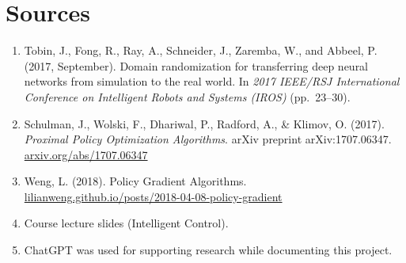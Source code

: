 \documentclass[11pt]{article}
\begin{document}
\section{Sources}

\begin{enumerate}
  \item Tobin, J., Fong, R., Ray, A., Schneider, J., Zaremba, W., and Abbeel, P. (2017, September).
  Domain randomization for transferring deep neural networks from simulation to the real world. In
  \emph{2017 IEEE/RSJ International Conference on Intelligent Robots and Systems (IROS)} (pp.~23--30).
  \item Schulman, J., Wolski, F., Dhariwal, P., Radford, A., \& Klimov, O. (2017). \emph{Proximal Policy
  Optimization Algorithms}. arXiv preprint arXiv:1707.06347.
  \href{https://arxiv.org/abs/1707.06347}{arxiv.org/abs/1707.06347}
  \item Weng, L. (2018). Policy Gradient Algorithms.
  \href{https://lilianweng.github.io/posts/2018-04-08-policy-gradient/}{lilianweng.github.io/posts/2018-04-08-policy-gradient}
  \item Course lecture slides (Intelligent Control).
  \item ChatGPT was used for supporting research while documenting this project.
\end{enumerate}
\end{document}
